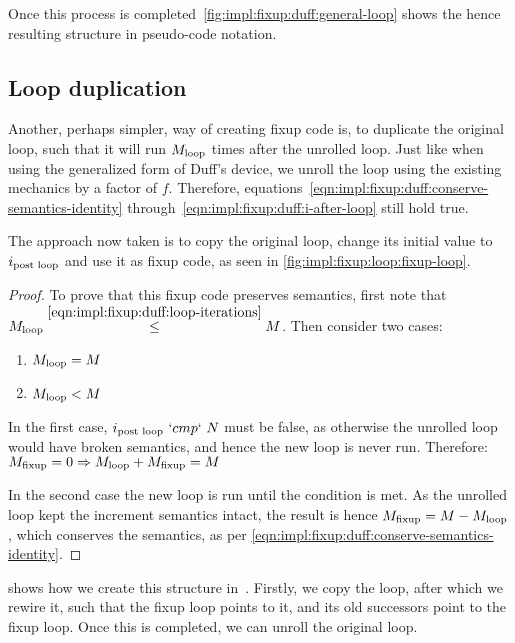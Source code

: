 





Once this process is completed~\cref{fig:impl:fixup:duff:general-loop} shows the hence resulting structure in pseudo-code notation.

\subsection{Loop duplication}\label{sec:impl:fixup:loop}

Another, perhaps simpler, way of creating fixup code is, to duplicate the original loop, such that it will run $M_{\text{loop}}$ times after the unrolled loop.
Just like when using the generalized form of Duff's device, we unroll the loop using the existing mechanics by a factor of $f$.
Therefore, equations~\ref{eqn:impl:fixup:duff:conserve-semantics-identity} through~\ref{eqn:impl:fixup:duff:i-after-loop} still hold true.

The approach now taken is to copy the original loop, change its initial value to $i_\text{post loop}$ and use it as fixup code, as seen in \cref{fig:impl:fixup:loop:fixup-loop}.



\begin{proof}
    To prove that this fixup code preserves semantics, first note that $M_{\text{loop}} \overset{\ref{eqn:impl:fixup:duff:loop-iterations}}{\leq} M$.
    Then consider two cases:
    \begin{enumerate}
        \item $M_{\text{loop}} = M$
        \item $M_{\text{loop}} < M$
    \end{enumerate}
    In the first case, $i_\text{post loop}~`cmp`~N$ must be false, as otherwise the unrolled loop would have broken semantics, and hence the new loop is never run.
    Therefore: $M_{\text{fixup}} = 0 \Rightarrow M_{\text{loop}} + M_{\text{fixup}} = M$

    In the second case the new loop is run until the condition is met.
    As the unrolled loop kept the increment semantics intact, the result is hence $M_{\text{fixup}} = M - M_{\text{loop}}$, which conserves the semantics, as per \cref{eqn:impl:fixup:duff:conserve-semantics-identity}.
\end{proof}

 shows how we create this structure in~\libFIRM.
Firstly, we copy the loop, after which we rewire it, such that the fixup loop points to it, and its old successors point to the fixup loop.
Once this is completed, we can unroll the original loop.

